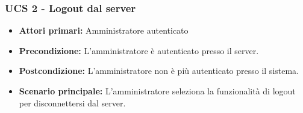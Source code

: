 \newpage

\subsubsection{UCS 2 - Logout dal server}

\begin{itemize}
\item \textbf{Attori primari:} Amministratore autenticato
\item \textbf{Precondizione:} L'amministratore è autenticato presso il server.
\item \textbf{Postcondizione:} L'amministratore non è più autenticato presso il sistema.
\item \textbf{Scenario principale:} L'amministratore seleziona la funzionalità di logout per disconnettersi dal server.
\end{itemize}
